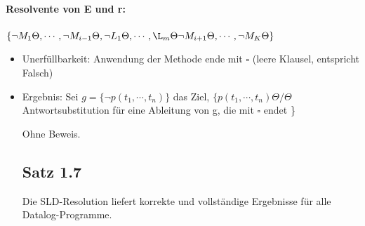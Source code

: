 \documentclass[12pt, a4paper]{article}
\begin{document}
\paragraph{Resolvente von E und r:} $\{ \lnot M_1\Theta, \cdots, \lnot M_{i-1}\Theta, \lnot L_1 \Theta, \cdots, \L_m \Theta \lnot M_{i + 1} \Theta, \cdots, \lnot M_K\Theta \}$
\begin{itemize}
\item Unerfüllbarkeit: Anwendung der Methode ende mit $\square$ (leere Klausel, entspricht Falsch)
\item Ergebnis: Sei $g = \{ \lnot p(t_1, \cdots, t_n) \}$ das Ziel, $\{ p(t_1, \cdots, t_n)\Theta / \Theta$ Antwortsubstitution für eine Ableitung von g, die mit $\square$ endet \}



Ohne Beweis.

\subsection{Satz 1.7}
Die SLD-Resolution liefert korrekte und vollständige Ergebnisse für alle Datalog-Programme.


\end{itemize}
\end{document}
